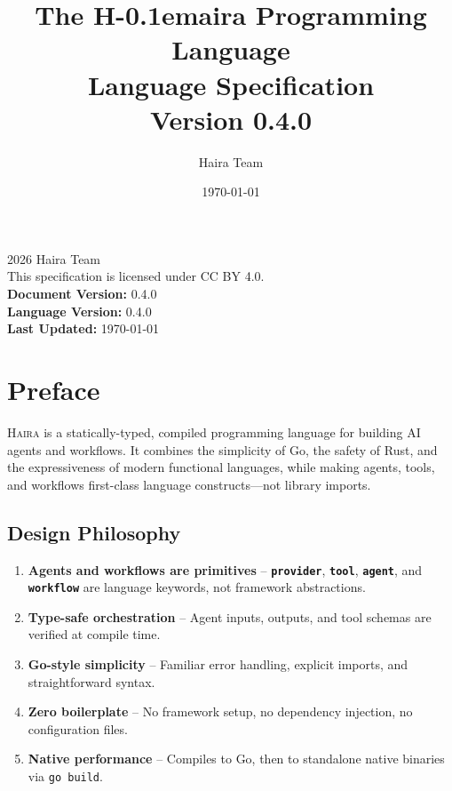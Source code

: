 \documentclass[11pt,a4paper]{book}
\title{
    \vspace{-2cm}
    {\Huge\bfseries\color{hairaFoundation} The \textcolor{hairaGold}{H\kern-0.1emai}ra Programming Language}\\[0.5cm]
    {\Large\color{hairaStraw} Language Specification}\\[1cm]
    {\large Version 0.4.0}
}
\author{Haira Team}
\date{\today}
\newcommand{\haira}{\textsc{Haira}}
\newcommand{\keyword}[1]{\texttt{\textbf{#1}}}
\newcommand{\code}[1]{\texttt{#1}}
\begin{document}
\maketitle
\thispagestyle{empty}

\newpage
\thispagestyle{empty}
\vspace*{\fill}
\begin{center}
\textcopyright{} 2026 Haira Team\\[1em]
This specification is licensed under CC BY 4.0.\\[2em]
\textbf{Document Version:} 0.4.0\\
\textbf{Language Version:} 0.4.0\\
\textbf{Last Updated:} \today
\end{center}
\vspace*{\fill}

\tableofcontents

\chapter*{Preface}

\haira{} is a statically-typed, compiled programming language for building AI agents and workflows. It combines the simplicity of Go, the safety of Rust, and the expressiveness of modern functional languages, while making agents, tools, and workflows first-class language constructs---not library imports.

\section*{Design Philosophy}

\begin{enumerate}
    \item \textbf{Agents and workflows are primitives} -- \keyword{provider}, \keyword{tool}, \keyword{agent}, and \keyword{workflow} are language keywords, not framework abstractions.
    \item \textbf{Type-safe orchestration} -- Agent inputs, outputs, and tool schemas are verified at compile time.
    \item \textbf{Go-style simplicity} -- Familiar error handling, explicit imports, and straightforward syntax.
    \item \textbf{Zero boilerplate} -- No framework setup, no dependency injection, no configuration files.
    \item \textbf{Native performance} -- Compiles to Go, then to standalone native binaries via \code{go build}.
\end{enumerate}
\end{document}
